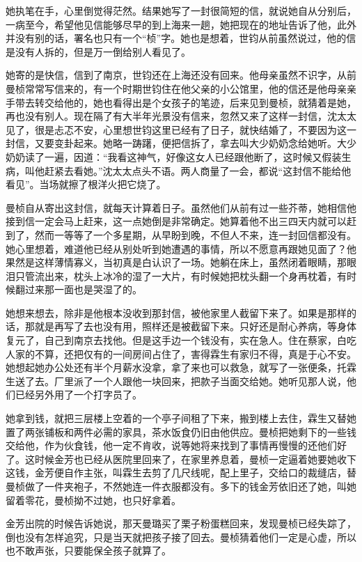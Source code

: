 \par 她执笔在手，心里倒觉得茫然。结果她写了一封很简短的信，就说她自从分别后，一病至今，希望他见信能够尽早的到上海来一趟，她把现在的地址告诉了他，此外并没有别的话，署名也只有一个“桢”字。她也是想着，世钧从前虽然说过，他的信是没有人拆的，但是万一倒给别人看见了。
\par 她寄的是快信，信到了南京，世钧还在上海还没有回来。他母亲虽然不识字，从前曼桢常常写信来的，有一个时期世钧住在他父亲的小公馆里，他的信还是他母亲亲手带去转交给他的，她也看得出是个女孩子的笔迹，后来见到曼桢，就猜着是她，再也没有别人。现在隔了有大半年光景没有信来，忽然又来了这样一封信，沈太太见了，很是忐忑不安，心里想世钧这里已经有了日子，就快结婚了，不要因为这一封信，又要变卦起来。她略一踌躇，便把信拆了，拿去叫大少奶奶念给她听。大少奶奶读了一遍，因道：“我看这神气，好像这女人已经跟他断了，这时候又假装生病，叫他赶紧去看她。”沈太太点头不语。两人商量了一会，都说“这封信不能给他看见”。当场就擦了根洋火把它烧了。
\par 曼桢自从寄出这封信，就每天计算着日子。虽然他们从前有过一些芥蒂，她相信他接到信一定会马上赶来，这一点她倒是非常确定。她算着他不出三四天内就可以赶到了，然而一等等了一个多星期，从早盼到晚，不但人不来，连一封回信都没有。她心里想着，难道他已经从别处听到她遭遇的事情，所以不愿意再跟她见面了？他果然是这样薄情寡义，当初真是白认识了一场。她躺在床上，虽然闭着眼睛，那眼泪只管流出来，枕头上冰冷的湿了一大片，有时候她把枕头翻一个身再枕着，有时候翻过来那一面也是哭湿了的。
\par 她想来想去，除非是他根本没收到那封信，被他家里人截留下来了。如果是那样的话，那就是再写了去也没有用，照样还是被截留下来。只好还是耐心养病，等身体复元了，自己到南京去找他。但是这手边一个钱没有，实在急人。住在蔡家，白吃人家的不算，还把仅有的一间房间占住了，害得霖生有家归不得，真是于心不安。她想起她办公处还有半个月薪水没拿，拿了来也可以救急，就写了一张便条，托霖生送了去。厂里派了一个人跟他一块回来，把款子当面交给她。她听见那人说，他们已经另外用了一个打字员了。
\par 她拿到钱，就把三层楼上空着的一个亭子间租了下来，搬到楼上去住，霖生又替她置了两张铺板和两件必需的家具，茶水饭食仍旧由他供应。曼桢把她剩下的一些钱交给他，作为伙食钱，他一定不肯收，说等她将来找到了事情再慢慢的还他们好了。这时候金芳也已经从医院里回来了，在家里养息着，曼桢一定逼着她要她收下这钱，金芳便自作主张，叫霖生去剪了几尺线呢，配上里子，交给口的裁缝店，替曼桢做了一件夹袍子，不然她连一件衣服都没有。多下的钱金芳依旧还了她，叫她留着零花，曼桢拗不过她，也只好拿着。
\par 金芳出院的时候告诉她说，那天曼璐买了栗子粉蛋糕回来，发现曼桢已经失踪了，倒也没有怎样追究，只是当天就把孩子接了回去。曼桢猜着他们一定是心虚，所以也不敢声张，只要能保全孩子就算了。
